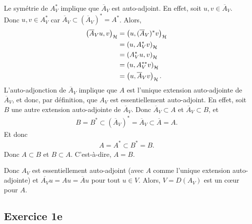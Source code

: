 Le symétrie de $A_V^*$ implique que
$\overline A_V$ est auto-adjoint. En effet,
soit $u,v \in \overline A_V$. Donc $u,v \in A_V^*$ car
$\overline A_V \subset (\overline A_V)^* = A^*$.
Alors,
\begin{align}
    \left( \overline A_V u, v \right)_{\mathcal{H}} &= \left( u, (\overline A_V)^* v \right)_{\mathcal{H}} \\
    &= \left( u, A_V^* v \right)_{\mathcal{H}} \\
    &= \left( A_V^* u, v \right)_{\mathcal{H}} \\
    &= \left( u, A_V^{**} v \right)_{\mathcal{H}} \\
    &= \left( u, \overline A_V v \right)_{\mathcal{H}}.
\end{align}
%
L'auto-adjonction de $\overline A_V$ implique que $A$ est l'unique
extension auto-adjointe de $\overline A_V$, et donc, par
définition, que $A_V$ est essentiellement auto-adjoint. En effet,
soit $B$ une autre extension auto-adjointe de $\overline A_V$.
Donc $\overline A_V \subset A$ et $\overline A_V \subset B$, et
\begin{align}
    B = B^* \subset (\overline A_V)^* = \overline A_V
    \subset \overline A = A.
\end{align}
%
Et donc
\begin{align}
    A = A^* \subset B^* = B.
\end{align}
%
Donc $A \subset B$ et $B \subset A$. C'est-à-dire, $A = B$.


%







Donc $A_V$ est essentiellement auto-adjoint (avec $A$ comme
l'unique extension auto-adjointe) et
$\overline{A_V}u = Au = \overline Au$ pour tout $u \in V$.
Alors, $V = D(A_V)$ est un c\oe{}ur pour $A$.










\subsection*{Exercice 1e}

